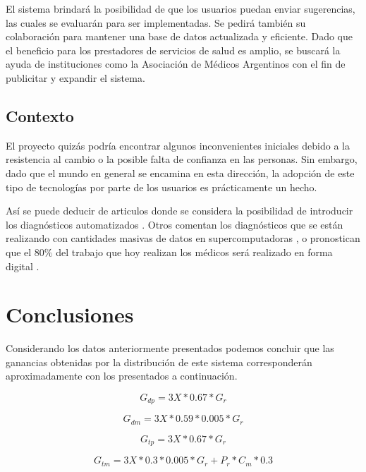\documentclass[a4paper,10pt]{article}
\begin{document}
El sistema brindará la posibilidad de que los usuarios puedan enviar sugerencias, las cuales se evaluarán para ser implementadas. Se pedirá también su colaboración para mantener una base de datos actualizada y eficiente. 
Dado que el beneficio para los prestadores de servicios de salud es amplio, se buscará la ayuda de instituciones como la Asociación de Médicos Argentinos con el fin de publicitar y expandir el sistema.

\subsection{Contexto}

El proyecto quizás podría encontrar algunos inconvenientes iniciales debido a la resistencia al cambio o la posible falta de confianza en las personas. Sin embargo, dado que el mundo en general se encamina en esta dirección, la adopción de este  tipo de tecnologías por parte de los usuarios es prácticamente un hecho. 

Así se puede deducir de articulos donde se considera la posibilidad de introducir los diagnósticos automatizados  \cite{link9}. Otros comentan los diagnósticos que se están realizando con cantidades masivas de datos en supercomputadoras \cite{link10}, o pronostican que el $80\%$ del trabajo que hoy realizan los médicos será realizado en forma digital \cite{link11}.



\section{Conclusiones}

Considerando los datos anteriormente presentados podemos concluir que las ganancias obtenidas por la distribución de este sistema corresponderán aproximadamente con los presentados a continuación.

\begin{equation}
\label{eq:diag_personas}
G_{dp} = 3 X * 0.67 * G_r
\end{equation}

\begin{equation}
\label{eq:diag_medicos}
G_{dm} = 3 X * 0.59 * 0.005 * G_r 
\end{equation}

\begin{equation}
\label{eq:tur_pacientes}
G_{tp} = 3 X * 0.67 * G_r
\end{equation}

\begin{equation}
\label{eq:tur_medicos}
G_{tm} = 3 X * 0.3 * 0.005 * G_r + P_r * C_m * 0.3
\end{equation}
\end{document}
